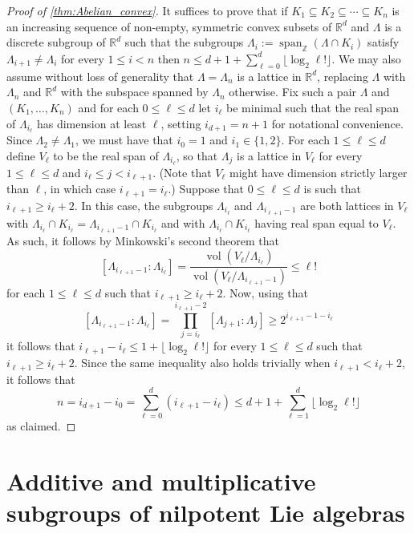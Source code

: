 \documentclass[11pt]{article}
\numberwithin{equation}{section}
\theoremstyle{plain}
\theoremstyle{definition}
\theoremstyle{remark}
\numberwithin{equation}{section}
\newcommand{\R}{\mathbb R}
\newcommand{\Z}{\mathbb Z}
\numberwithin{equation}{section}
\newcommand{\spanZ}{\operatorname{span}_\Z}
\begin{document}
\begin{proof}[Proof of \cref{thm:Abelian_convex}]
It suffices to prove that if $K_1\subseteq K_2\subseteq \cdots \subseteq K_n$ is an increasing sequence of non-empty, symmetric convex subsets of $\R^d$ and $\Lambda$ is a discrete subgroup of $\R^d$ such that the subgroups $\Lambda_i:=\spanZ( \Lambda \cap K_i)$ satisfy $\Lambda_{i+1}\neq \Lambda_i$ for every $1\leq i < n$ then $n \leq d+1+\sum_{\ell=0}^d \lfloor \log_2 \ell! \rfloor$. 
We may also assume without loss of generality that $\Lambda=\Lambda_n$ is a lattice in $\R^d$, replacing $\Lambda$ with $\Lambda_n$ and $\R^d$ with the subspace spanned by $\Lambda_n$ otherwise.
Fix such a pair $\Lambda$ and $(K_1,\ldots,K_n)$ and for each $0\leq \ell \leq d$ let $i_\ell$ be minimal such that the real span of $\Lambda_{i_\ell}$ has dimension at least $\ell$, setting $i_{d+1}=n+1$ for notational convenience. 
Since $\Lambda_2\neq \Lambda_1$, we must have that $i_0=1$ and $i_1 \in \{1,2\}$. For each $1\leq \ell \leq d$ define $V_\ell$ to be the real span of $\Lambda_{i_\ell}$, so that $\Lambda_j$ is a lattice in $V_\ell$ for every $1\leq \ell \leq d$ and $i_\ell \leq j <i_{\ell+1}$. (Note that $V_\ell$ might have dimension strictly larger than $\ell$, in which case $i_{\ell+1}=i_\ell$.) Suppose that $0\leq \ell \leq d$ is such that $i_{\ell+1} \geq i_\ell + 2$. In this case, the subgroups $\Lambda_{i_\ell}$ and $\Lambda_{i_{\ell+1}-1}$ are both lattices in $V_\ell$ with $\Lambda_{i_\ell} \cap K_{i_\ell}=\Lambda_{i_{\ell+1}-1} \cap K_{i_\ell}$ and with $\Lambda_{i_\ell}\cap K_{i_\ell}$ having real span equal to $V_\ell$. As such, it follows by Minkowski's second theorem that
\[
[ \Lambda_{i_{\ell+1}-1}: \Lambda_{i_\ell}] = \frac{\operatorname{vol}(V_\ell/\Lambda_{i_\ell})}{\operatorname{vol}(V_\ell/\Lambda_{i_{\ell+1}-1})} \leq \ell!
\]
for each $1\leq \ell \leq d$ such that $i_{\ell+1} \geq i_\ell+2$.
Now, using that
\[
[ \Lambda_{i_{\ell+1}-1}: \Lambda_{i_\ell}] = \prod_{j=i_\ell}^{i_{\ell+1}-2} [ \Lambda_{j+1}: \Lambda_{j}] \geq 2^{i_{\ell+1}-1-i_\ell}
\]
it follows that $i_{\ell+1}-i_\ell \leq 1+\lfloor\log_2 \ell! \rfloor$
for every $1\leq \ell \leq d$ such that $i_{\ell+1} \geq i_\ell+2$. Since the same inequality also holds trivially when $i_{\ell+1} < i_\ell+2$, it follows that
\[
n = i_{d+1}-i_0 = \sum_{\ell=0}^d (i_{\ell+1}-i_\ell) \leq d+1 + \sum_{\ell=1}^d \lfloor \log_2 \ell!\rfloor
\]
as claimed.
%
\end{proof}

\section{Additive and multiplicative subgroups of nilpotent Lie algebras}
\label{sec:nilpotent_lattices}
%
\end{document}

